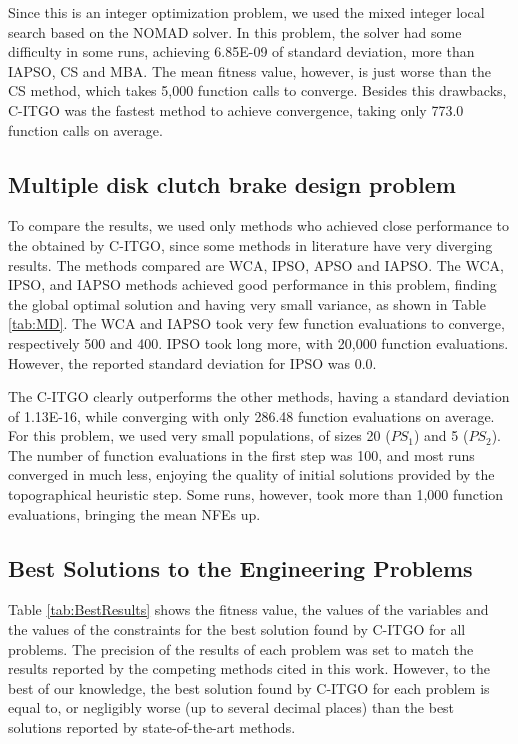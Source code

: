 


Since this is an integer optimization problem, we used the mixed integer local search based on the NOMAD solver. In this problem, the solver had some difficulty in some runs, achieving 6.85E-09 of standard deviation, more than IAPSO, CS and MBA. The mean fitness value, however, is just worse than the CS method, which takes 5,000 function calls to converge. Besides this drawbacks, C-ITGO was the fastest method to achieve convergence, taking only 773.0 function calls on average.



\subsection{Multiple disk clutch brake design problem}




To compare the results, we used only methods who achieved close performance to the obtained by C-ITGO, since some methods in literature have very diverging results. The methods compared are WCA, IPSO, APSO and IAPSO. The WCA, IPSO, and IAPSO methods achieved good performance in this problem, finding the global optimal solution and having very small variance, as shown in Table \ref{tab:MD}. The WCA and IAPSO took very few function evaluations to converge, respectively 500 and 400. IPSO took long more, with 20,000 function evaluations. However, the reported standard deviation for IPSO was 0.0.



The C-ITGO clearly outperforms the other methods, having a standard deviation of 1.13E-16, while converging with only 286.48 function evaluations on average. For this problem, we used very small populations, of sizes 20 ($PS_1$) and 5 ($PS_2$). The number of function evaluations in the first step was 100, and most runs converged in much less, enjoying the quality of initial solutions provided by the topographical heuristic step. Some runs, however, took more than 1,000 function evaluations, bringing the mean NFEs up.



\subsection{Best Solutions to the Engineering Problems}

Table \ref{tab:BestResults} shows the fitness value, the values of the variables and the values of the constraints for the best solution found by C-ITGO for all problems. The precision of the results of each problem was set to match the results reported by the competing methods cited in this work. However, to the best of our knowledge, the best solution found by C-ITGO for each problem is equal to, or negligibly worse (up to several decimal places) than the best solutions reported by state-of-the-art methods.

